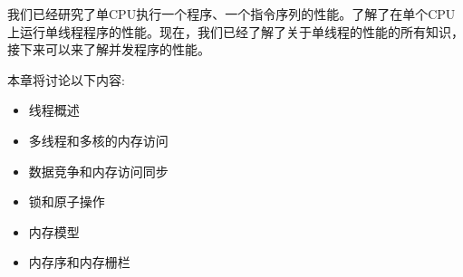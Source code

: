我们已经研究了单CPU执行一个程序、一个指令序列的性能。了解了在单个CPU上运行单线程程序的性能。现在，我们已经了解了关于单线程的性能的所有知识，接下来可以来了解并发程序的性能。

本章将讨论以下内容:

\begin{itemize}
\item 线程概述
\item 多线程和多核的内存访问
\item 数据竞争和内存访问同步
\item 锁和原子操作
\item 内存模型
\item 内存序和内存栅栏
\end{itemize}
